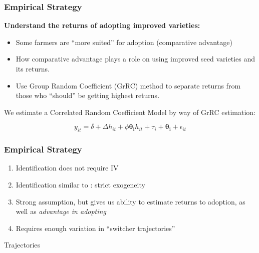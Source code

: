 \documentclass{beamer}
\begin{document}
\begin{frame}
\frametitle{Empirical Strategy}

\textbf{Understand the returns of adopting improved varieties: }
\begin{itemize}
    \item Some farmers are ``more suited'' for adoption (comparative advantage) \citep{Suri2011-oi}
    \item How comparative advantage plays a role on using improved seed varieties and its returns.
    \item Use Group Random Coefficient (GrRC) method \citep{Tjernstrom_Emilia_Dalia_Ghanem_Oscar_Barriga_Cabanillas_Travis_J_Lybbert_Jeffrey_D_Michler_and_Aleksandr_Michuda2020-bc} to  separate returns from those who ``should'' be getting highest returns.
\end{itemize}  


We estimate a Correlated Random Coefficient Model by way of GrRC estimation:
\vspace{-2em}
\begin{center}
$$
    y_{it}= \delta + \Delta h_{it} + \phi\boldsymbol{\theta_i} h_{it} + \tau_{i} + \boldsymbol{\theta_i} + \epsilon_{it}
$$  
\end{center}

\end{frame}


\begin{frame}
\frametitle{Empirical Strategy}
\begin{enumerate}
    \item Identification does not require IV
    \item Identification similar to \cite{Chamberlain1984-uk}: strict exogeneity
    \item Strong assumption, but gives us ability to estimate returns to adoption, as well as \textit{advantage in adopting}
    \item Requires enough variation in ``switcher trajectories'' 
\end{enumerate}
\end{frame}

\begin{frame}{Trajectories}


\end{frame}
\end{document}

